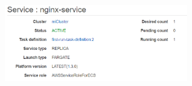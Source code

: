 \documentclass[english,runningheads,a4paper]{llncs}[2018/03/10]
\newenvironment{nscenter}
 {\parskip=0pt\par\nopagebreak\centering}
 {\par\noindent\ignorespacesafterend}
\begin{document}
\begin{nscenter}
\includegraphics[width=8cm,height=8cm,keepaspectratio]{./Contenedores/AWS/20.png}
\end{nscenter}
\newpage
\end{document}

